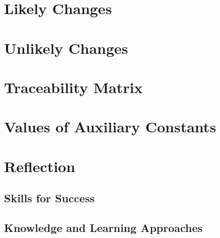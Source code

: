 \documentclass[12pt]{article}
\begin{document}
\section{Likely Changes}
\section{Unlikely Changes}

\section{Traceability Matrix}

\appendix
\section{Values of Auxiliary Constants}

\newpage

\appendix
\section{Reflection}
\subsection{Skills for Success}
\subsection{Knowledge and Learning Approaches}
\end{document}
